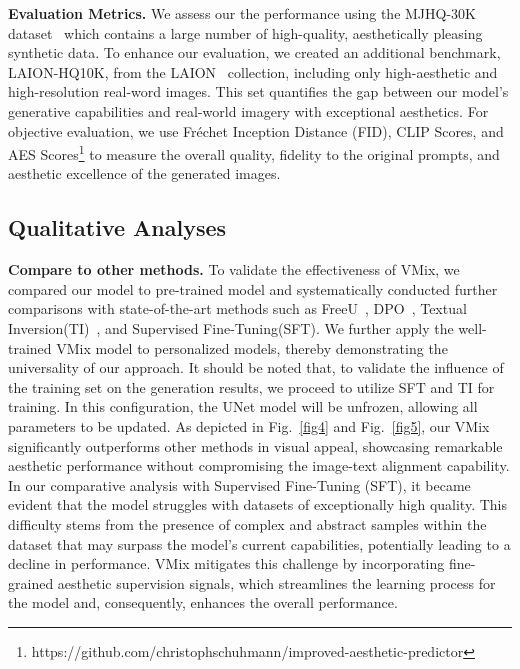 \noindent \textbf{Evaluation Metrics.} We assess our the performance using the MJHQ-30K dataset~\cite{li2024playground} which contains a large number of high-quality, aesthetically pleasing synthetic data. To enhance our evaluation, we created an additional benchmark, LAION-HQ10K, from the LAION~\cite{schuhmann2021laion} collection, including only high-aesthetic and high-resolution real-word images. This set quantifies the gap between our model's generative capabilities and real-world imagery with exceptional aesthetics. For objective evaluation, we use Fréchet Inception Distance (FID), CLIP Scores, and AES Scores\footnote{https://github.com/christophschuhmann/improved-aesthetic-predictor} to measure the overall quality, fidelity to the original prompts, and aesthetic excellence of the generated images.

\subsection{Qualitative Analyses}
\noindent \textbf{Compare to other methods.} To validate the effectiveness of VMix, we compared our model to pre-trained model and systematically conducted further comparisons with state-of-the-art methods such as FreeU~\cite{si2023freeu}, DPO~\cite{wallace2024diffusion}, Textual Inversion(TI)~\cite{gal2022image}, and Supervised Fine-Tuning(SFT). We further apply the well-trained VMix model to personalized models, thereby demonstrating the universality of our approach. It should be noted that, to validate the influence of the training set on the generation results, we proceed to utilize SFT and TI for training. In this configuration, the UNet model will be unfrozen, allowing all parameters to be updated. As depicted in Fig.~\ref{fig4} and Fig.~\ref{fig5}, our VMix significantly outperforms other methods in visual appeal, showcasing remarkable aesthetic performance without compromising the image-text alignment capability. In our comparative analysis with Supervised Fine-Tuning (SFT), it became evident that the model struggles with datasets of exceptionally high quality. This difficulty stems from the presence of complex and abstract samples within the dataset that may surpass the model's current capabilities, potentially leading to a decline in performance. VMix mitigates this challenge by incorporating fine-grained aesthetic supervision signals, which streamlines the learning process for the model and, consequently, enhances the overall performance.

